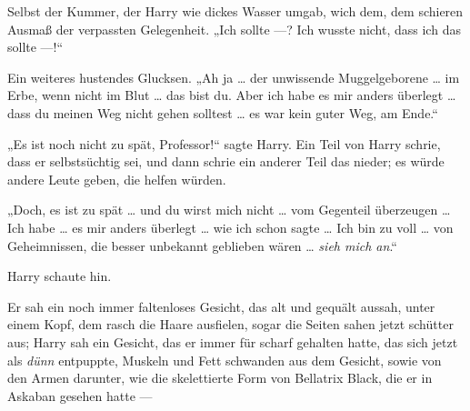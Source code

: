 Selbst der Kummer, der Harry wie dickes Wasser umgab, wich dem, dem schieren Ausmaß der verpassten Gelegenheit.
„Ich sollte —? Ich wusste nicht, dass ich das sollte —!“

Ein weiteres hustendes Glucksen.
„Ah ja … der unwissende Muggelgeborene … im Erbe, wenn nicht im Blut … das bist du. Aber ich habe es mir anders überlegt … dass du meinen Weg nicht gehen solltest … es war kein guter Weg, am Ende.“

„Es ist noch nicht zu spät, Professor!“ sagte Harry.
Ein Teil von Harry schrie, dass er selbstsüchtig sei, und dann schrie ein anderer Teil das nieder; es würde andere Leute geben, die helfen würden.

„Doch, es ist zu spät … und du wirst mich nicht … vom Gegenteil überzeugen … Ich habe … es mir anders überlegt … wie ich schon sagte … Ich bin zu voll … von Geheimnissen, die besser unbekannt geblieben wären … \emph{sieh mich an}.“

Harry schaute hin.

Er sah ein noch immer faltenloses Gesicht, das alt und gequält aussah, unter einem Kopf, dem rasch die Haare ausfielen, sogar die Seiten sahen jetzt schütter aus; Harry sah ein Gesicht, das er immer für scharf gehalten hatte, das sich jetzt als \emph{dünn} entpuppte, Muskeln und Fett schwanden aus dem Gesicht, sowie von den Armen darunter, wie die skelettierte Form von Bellatrix Black, die er in Askaban gesehen hatte —

